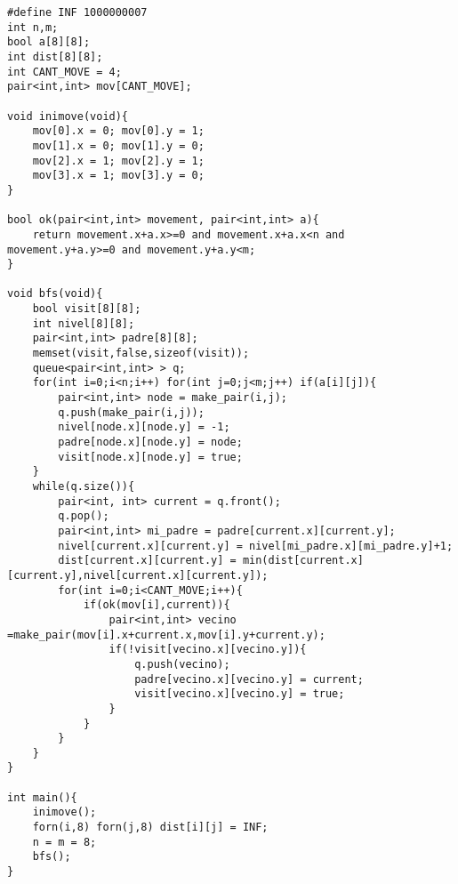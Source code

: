 \begin{verbatim}
#define INF 1000000007
int n,m;
bool a[8][8];
int dist[8][8];
int CANT_MOVE = 4;
pair<int,int> mov[CANT_MOVE];

void inimove(void){
    mov[0].x = 0; mov[0].y = 1;
    mov[1].x = 0; mov[1].y = 0;
    mov[2].x = 1; mov[2].y = 1;
    mov[3].x = 1; mov[3].y = 0;
}

bool ok(pair<int,int> movement, pair<int,int> a){
    return movement.x+a.x>=0 and movement.x+a.x<n and movement.y+a.y>=0 and movement.y+a.y<m;  
}

void bfs(void){
    bool visit[8][8];
    int nivel[8][8];
    pair<int,int> padre[8][8];
    memset(visit,false,sizeof(visit));
    queue<pair<int,int> > q;
    for(int i=0;i<n;i++) for(int j=0;j<m;j++) if(a[i][j]){
        pair<int,int> node = make_pair(i,j);
        q.push(make_pair(i,j));
        nivel[node.x][node.y] = -1;
        padre[node.x][node.y] = node;
        visit[node.x][node.y] = true;
    }
    while(q.size()){
        pair<int, int> current = q.front();
        q.pop();
        pair<int,int> mi_padre = padre[current.x][current.y];
        nivel[current.x][current.y] = nivel[mi_padre.x][mi_padre.y]+1;
        dist[current.x][current.y] = min(dist[current.x][current.y],nivel[current.x][current.y]);
        for(int i=0;i<CANT_MOVE;i++){
            if(ok(mov[i],current)){
                pair<int,int> vecino =make_pair(mov[i].x+current.x,mov[i].y+current.y);
                if(!visit[vecino.x][vecino.y]){
                    q.push(vecino);
                    padre[vecino.x][vecino.y] = current;
                    visit[vecino.x][vecino.y] = true;
                }
            }
        }  
    }
}

int main(){
    inimove();
    forn(i,8) forn(j,8) dist[i][j] = INF;
    n = m = 8;
    bfs();
}
\end{verbatim}